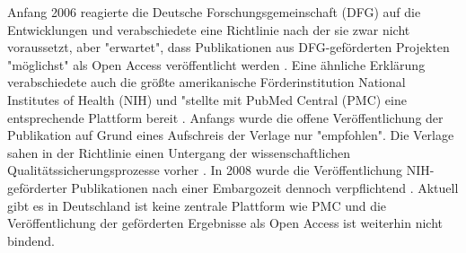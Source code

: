 Anfang 2006 reagierte die Deutsche Forschungsgemeinschaft (DFG) auf die Entwicklungen und verabschiedete eine Richtlinie nach der sie zwar nicht voraussetzt, aber "erwartet", dass Publikationen aus DFG-geförderten Projekten "möglichst" als Open Access veröffentlicht werden \cite{suchen:dfg-richtlinie}. Eine ähnliche Erklärung verabschiedete auch die größte amerikanische Förderinstitution National Institutes of Health (NIH) und "stellte mit PubMed Central (PMC) eine entsprechende Plattform bereit \cite{muller_2010_open}. Anfangs wurde die offene Veröffentlichung der Publikation auf Grund eines Aufschreis der Verlage nur "empfohlen". Die Verlage sahen in der Richtlinie einen Untergang der wissenschaftlichen Qualitätssicherungsprozesse vorher \cite{Baggs_2006}. In 2008 wurde die Veröffentlichung NIH-geförderter Publikationen nach einer Embargozeit dennoch verpflichtend \cite{Hanekop_2014}. Aktuell gibt es in Deutschland ist keine zentrale Plattform wie PMC und die Veröffentlichung der geförderten Ergebnisse als Open Access ist weiterhin nicht bindend.

